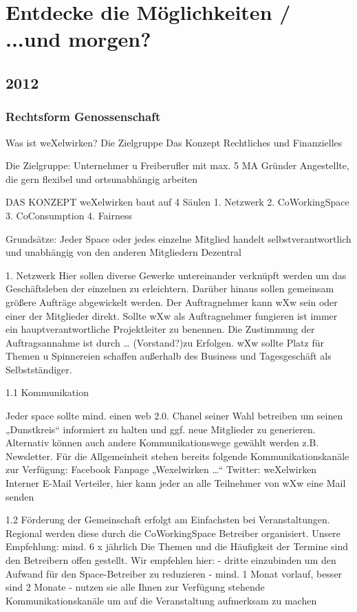 \chapter{Entdecke die Möglichkeiten / ...und morgen?}

  \section{2012}
\subsection{Rechtsform Genossenschaft}
Was ist weXelwirken?
Die Zielgruppe
Das Konzept
Rechtliches und Finanzielles

Die Zielgruppe:
Unternehmer u Freiberufler mit max. 5 MA
Gründer
Angestellte, die gern flexibel und ortsunabhängig arbeiten 


DAS KONZEPT
weXelwirken baut auf 4 Säulen
1. Netzwerk
2. CoWorkingSpace
3. CoConsumption 
4. Fairness 

Grundsätze:
Jeder Space oder jedes einzelne Mitglied handelt selbstverantwortlich und unabhängig von den anderen Mitgliedern
Dezentral



1. Netzwerk
Hier sollen diverse Gewerke untereinander verknüpft werden um das Geschäftsleben der einzelnen zu erleichtern. Darüber hinaus sollen gemeinsam größere Aufträge abgewickelt werden. Der Auftragnehmer kann wXw sein oder einer der Mitglieder direkt.
Sollte wXw als Auftragnehmer fungieren ist immer ein hauptverantwortliche Projektleiter zu benennen. Die Zustimmung der Auftragsannahme ist durch … (Vorstand?)zu Erfolgen.
wXw sollte Platz für Themen u Spinnereien schaffen außerhalb des Business und Tagesgeschäft als Selbstständiger.

1.1 Kommunikation 

Jeder space sollte mind. einen web 2.0. Chanel seiner Wahl betreiben um seinen „Dunstkreis“ informiert zu halten und ggf. neue Mitglieder zu generieren. Alternativ können auch andere Kommunikationswege gewählt werden z.B. Newsletter.
Für die Allgemeinheit stehen bereits folgende Kommunikationskanäle zur Verfügung:
Facebook Fanpage „Wexelwirken …“
Twitter: weXelwirken
Interner E-Mail Verteiler, hier kann jeder an alle Teilnehmer von wXw eine Mail senden 


1.2 Förderung der Gemeinschaft
erfolgt am Einfachsten bei Veranstaltungen. 
Regional werden diese durch die CoWorkingSpace Betreiber organisiert. Unsere Empfehlung: mind. 6 x jährlich 
Die Themen und die Häufigkeit der Termine sind den Betreibern offen gestellt. Wir empfehlen hier:
- dritte einzubinden um den Aufwand für den Space-Betreiber zu reduzieren
- mind. 1 Monat vorlauf, besser sind 2 Monate
- nutzen sie alle Ihnen zur Verfügung stehende Kommunikationskanäle um auf die Veranstaltung aufmerksam zu machen


